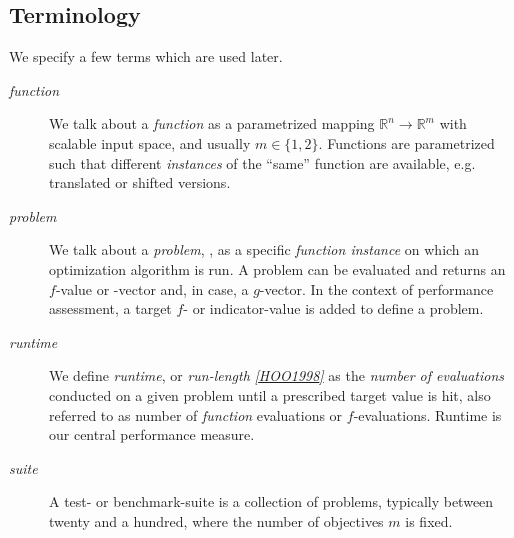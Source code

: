 \documentclass[letterpaper,12pt,english]{article}
\begin{document}
\subsection{Terminology}
\label{index:terminology}
We specify a few terms which are used later.
\begin{description}
\item[{\emph{function}}] \leavevmode
We talk about a \emph{function} as a parametrized mapping
\(\mathbb{R}^n\to\mathbb{R}^m\) with scalable input space, and usually \(m\in\{1,2\}\).
Functions are parametrized such that different \emph{instances} of the
``same'' function are available, e.g. translated or shifted versions.

\item[{\emph{problem}}] \leavevmode
We talk about a \emph{problem}, \href{http://numbbo.github.io/coco-doc/C/coco\_8h.html\#a408ba01b98c78bf5be3df36562d99478}{}, as a specific \emph{function
instance} on which an optimization algorithm is run.
A problem
can be evaluated and returns an \(f\)-value or -vector and, in case,
a \(g\)-vector.
In the context of performance assessment, a target \(f\)- or
indicator-value is added to define a problem.

\item[{\emph{runtime}}] \leavevmode
We define \emph{runtime}, or \emph{run-length} \label{index:id21}{\hyperref[index:hoo1998]{\emph{{[}HOO1998{]}}}} as the \emph{number of
evaluations} conducted on a given problem until a prescribed target value is
hit, also referred to as number of \emph{function} evaluations or \(f\)-evaluations.
Runtime is our central performance measure.

\item[{\emph{suite}}] \leavevmode
A test- or benchmark-suite is a collection of problems, typically between
twenty and a hundred, where the number of objectives \(m\) is fixed.

\end{description}
\end{document}
